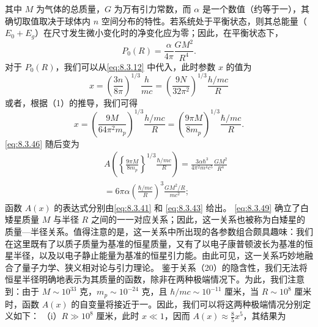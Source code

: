 其中 \(M\) 为气体的总质量，\(G\) 为万有引力常数，而 \(\alpha\) 是一个数值（约等于一），其确切取值取决于球体内 \(n\) 空间分布的特性。若系统处于平衡状态，则其总能量（\(E_0 + E_g\)）在尺寸发生微小变化时的净变化应为零；因此，在平衡状态下，
\begin{equation}\tag{8.3.46}\label{eq:8.3.46}
P _ { 0 } ( R ) = \frac { \alpha } { 4 \pi } \frac { G M ^{2} } { R ^{4} } .
\end{equation}
对于 \(P_{0}(R)\)，我们可以从\autoref{eq:8.3.12} 中代入，此时参数 \(x\) 的值为
\begin{equation}\tag{8.3.47}\label{eq:8.3.47}
x = \left( { \frac { 3 n } { 8 \pi } } \right) ^{1 / 3} { \frac { h } { m c } } = \left( { \frac { 9 N } { 32 \pi ^{2} } } \right) ^{1 / 3} { \frac { h / m c } { R } }
\end{equation}
或者，根据（1）的推导，我们可得
\begin{equation}\tag{8.3.48}\label{eq:8.3.48}
x = \left( \frac { 9 M } { 64 \pi ^{2} m _ { p } } \right) ^{1 / 3} \frac { h / m c } { R } = \left( \frac { 9 \pi M } { 8 m _ { p } } \right) ^{1 / 3} \frac { \hbar / m c } { R } .
\end{equation}
\autoref{eq:8.3.46} 随后变为
\begin{equation}\tag{8.3.49}\label{eq:8.3.49}
\begin{array}{rlr} & { } & { A \left( \left\{ \frac { 9 \pi M } { 8 m _ { p } } \right\} ^{1 / 3} \frac { \hbar / m c } { R } \right) = \frac { 3 \alpha \hbar ^{3} } { 4 \pi ^{2} m ^{4} c ^{5} } \frac { G M ^{2} } { R ^{4} } } \\& { } & { = 6 \pi \alpha \left( \frac { \hbar / m c } { R } \right) ^{3} \frac { G M ^{2} / R } { m c ^{2} } ; } \end{array}
\end{equation}
函数 \(A(x)\) 的表达式分别由\autoref{eq:8.3.41} 和 \autoref{eq:8.3.43} 给出。
\autoref{eq:8.3.49} 确立了白矮星质量 \(M\) 与半径 \(R\) 之间的一一对应关系；因此，这一关系也被称为白矮星的质量---半径关系。值得注意的是，这一关系中所出现的各参数组合颇具趣味：我们在这里既有了以质子质量为基准的恒星质量，又有了以电子康普顿波长为基准的恒星半径，以及以电子静止能量为基准的恒星引力能。由此可见，这一关系巧妙地融合了量子力学、狭义相对论与引力理论。
鉴于关系（20）的隐含性，我们无法将恒星半径明确地表示为其质量的函数，除非在两种极端情况下。为此，我们注意到：由于 \(M \sim 10^{33}\) 克，\(m_{p} \sim 10^{-24}\) 克，且 \(\hbar/mc \sim 10^{-11}\) 厘米，当 \(R \sim 10^{8}\) 厘米时，函数 \(A(x)\) 的自变量将接近于一。因此，我们可以将这两种极端情况分别定义如下：
（i）\(R \gg 10^{8}\) 厘米，此时 \(x \ll 1\)，因而 \(A(x) \approx \frac{8}{5}x^{5}\)，其结果为
